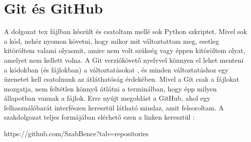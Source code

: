 \documentclass{article}
\theoremstyle{definition}
\theoremstyle{theorem}
\begin{document}
\section{Git és GitHub}
A dolgozat tex fájlban készült és csatoltam mellé sok Python szkriptet. Mivel sok a kód, nehéz nyomon követni, hogy mikor mit változtattam meg, esetleg kitöröltem valami olyasmit, amire nem volt szükség vagy éppen kitöröltem olyat, amelyet nem kellett volna. A Git verziókövető nyelvvel könnyen el lehet menteni a kódokban (és fájlokban) a változtatásokat , és minden változtatáshoz egy üzenetet kell csatolnunk az átláthatóság érdekében. Mivel a Git csak a fájlokat mozgatja, nem feltétlen könnyű átlátni a terminálban, hogy épp milyen állapotban vannak a fájlok. Erre nyújt megoldást a GitHub, ahol egy felhasználóbarát interfészen keresztül látható mindaz, amit felsoroltam. A szakdolgozat teljes formájában elérhető ezen a linken keresztül :
\begin{center}
    https://github.com/SzabBence?tab=repositories
\end{center}
\end{document}
